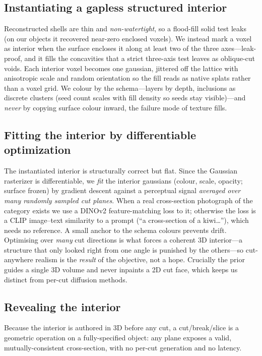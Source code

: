 \documentclass[10pt,twocolumn,letterpaper]{article}
\begin{document}
\subsection{Instantiating a gapless structured interior}
Reconstructed shells are thin and \emph{non-watertight}, so a flood-fill
solid test leaks (on our objects it recovered near-zero enclosed voxels).
We instead mark a voxel as interior when the surface encloses it along at
least two of the three axes---leak-proof, and it fills the concavities
that a strict three-axis test leaves as oblique-cut voids. Each interior
voxel becomes one gaussian, jittered off the lattice with anisotropic
scale and random orientation so the fill reads as native splats rather
than a voxel grid. We colour by the schema---layers by depth, inclusions
as discrete clusters (seed count scales with fill density so seeds stay
visible)---and \emph{never} by copying surface colour inward, the failure
mode of texture fills.

\subsection{Fitting the interior by differentiable optimization}
The instantiated interior is structurally correct but flat. Since the
Gaussian rasterizer is differentiable, we \emph{fit} the interior
gaussians (colour, scale, opacity; surface frozen) by gradient descent
against a perceptual signal \emph{averaged over many randomly sampled cut
planes}. When a real cross-section photograph of the category exists we
use a DINOv2 feature-matching loss to it; otherwise the loss is a CLIP
image--text similarity to a prompt (``a cross-section of a kiwi\ldots''),
which needs no reference. A small anchor to the schema colours prevents
drift. Optimising over \emph{many} cut directions is what forces a
coherent 3D interior---a structure that only looked right from one angle
is punished by the others---so cut-anywhere realism is the \emph{result}
of the objective, not a hope. Crucially the prior guides a single 3D
volume and never inpaints a 2D cut face, which keeps us distinct from
per-cut diffusion methods.

\subsection{Revealing the interior}
Because the interior is authored in 3D before any cut, a cut/break/slice
is a geometric operation on a fully-specified object: any plane exposes a
valid, mutually-consistent cross-section, with no per-cut generation and
no latency.
\end{document}
